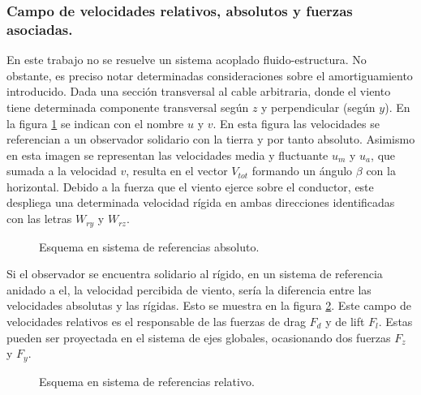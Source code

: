 \subsubsection{Campo de velocidades relativos, absolutos y fuerzas asociadas.}\label{SubSec:MET:CampoVelRealt}
 En este trabajo no se resuelve un sistema acoplado fluido-estructura. No obstante, es preciso notar determinadas consideraciones sobre el amortiguamiento introducido. Dada una sección  transversal al cable arbitraria, donde el viento tiene determinada componente transversal según $z$ y perpendicular (según $y$). En la figura \ref{fig:MET:Viento:VelAbs} se indican con el nombre $u$ y $v$. En esta figura las velocidades se referencian a un observador solidario con la tierra y por tanto  absoluto. Asimismo en esta imagen se representan las velocidades media y fluctuante $u_m$ y $u_a$, que sumada a la velocidad $v$, resulta en el vector $V_{tot}$ formando un ángulo $\beta$ con la horizontal. Debido a la fuerza que el viento ejerce sobre el conductor, este despliega una determinada velocidad rígida en ambas direcciones identificadas con las letras $W_{ry}$ y $W_{rz}$. 
% 

\begin{figure}[htbp]
	\centering
	\def\svgwidth{60mm}
	
	\caption{Esquema en sistema de referencias absoluto.}
	\label{fig:MET:Viento:VelAbs}
\end{figure}

Si el observador se encuentra solidario al rígido, en un sistema de referencia anidado a el, la velocidad percibida de viento, sería la diferencia entre las velocidades absolutas y las rígidas. Esto se muestra en la figura \ref{fig:MET:Viento:VelRel}. Este campo de velocidades relativos es el responsable de las fuerzas de drag $F_d$ y  de lift $F_l$. Estas pueden ser proyectada en el sistema de ejes globales, ocasionando dos fuerzas $F_z$ y $F_y$.


\begin{figure}[htbp]
	\centering
	\def\svgwidth{80mm}
	
	\caption{Esquema en sistema de referencias relativo.}
	\label{fig:MET:Viento:VelRel}
\end{figure}

